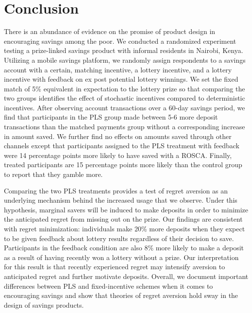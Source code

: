 \documentclass[11pt]{article}
\begin{document}
		

		

\section{Conclusion} \label{sec:conclusion}

	There is an abundance of evidence on the promise of product design in encouraging savings among the poor. We conducted a randomized experiment testing a prize-linked savings product with informal residents in Nairobi, Kenya. Utilizing a mobile savings platform, we randomly assign respondents to a savings account with a certain, matching incentive, a lottery incentive, and a lottery incentive with feedback on ex post potential lottery winnings. We set the fixed match of 5\% equivalent in expectation to the lottery prize so that comparing the two groups identifies the effect of stochastic incentives compared to deterministic incentives. After observing account transactions over a 60-day savings period, we find that participants in the PLS group made between 5-6 more deposit transactions than the matched payments group without a corresponding increase in amount saved. We further find no effects on amounts saved through other channels except that participants assigned to the PLS treatment with feedback were 14 percentage points more likely to have saved with a ROSCA. Finally, treated participants are 15 percentage points more likely than the control group to report that they gamble more.

	Comparing the two PLS treatments provides a test of regret aversion as an underlying mechanism behind the increased usage that we observe. Under this hypothesis, marginal savers will be induced to make deposits in order to minimize the anticipated regret from missing out on the prize. Our findings are consistent with regret minimization: individuals make 20\% more deposits when they expect to be given feedback about lottery results regardless of their decision to save. Participants in the feedback condition are also 8\% more likely to make a deposit as a result of having recently won a lottery without a prize. Our interpretation for this result is that recently experienced regret may intensify aversion to anticipated regret and further motivate deposits. Overall, we document important differences between PLS and fixed-incentive schemes when it comes to encouraging savings and show that theories of regret aversion hold sway in the design of savings products.
\end{document}
